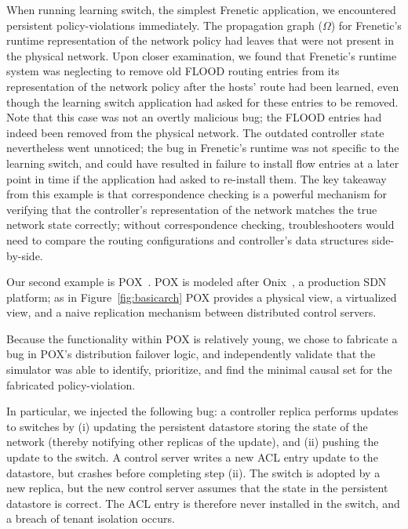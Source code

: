 When running learning switch, the simplest Frenetic application, we encountered
persistent policy-violations immediately. The propagation graph ($\Omega$) for Frenetic's
runtime representation of the network policy had leaves that were not present
in the physical network. Upon closer examination, we found that Frenetic's
runtime system was neglecting to remove old FLOOD routing entries from its
representation of the network policy after the hosts' route had been learned,
even though the learning switch application had
asked for these entries to be removed. Note that this case was not an overtly
malicious bug; the FLOOD entries had indeed been removed from the physical
network. The outdated controller state nevertheless went unnoticed; the bug in
Frenetic's runtime was not specific to the learning switch, and could have
resulted in failure to install flow entries at a later point in time if the
application had asked to re-install them. The key takeaway from this example
is that correspondence checking is a powerful mechanism for
verifying that the controller's representation of the network matches the true
network state correctly; without correspondence checking, troubleshooters
would need to compare the routing configurations and controller's data
structures side-by-side.


Our second example is POX~\cite{pox}. POX is modeled after
Onix~\cite{onix}, a production SDN platform; as in Figure~\ref{fig:basicarch} 
POX provides a physical view, a virtualized view, and a naive replication
mechanism between distributed control servers.

Because the functionality within POX is relatively young, we chose to
fabricate a bug in POX's distribution failover logic, and independently
validate that the simulator was able to identify, prioritize, and find the
minimal causal set for the fabricated policy-violation.

In particular, we injected the following bug: a controller replica performs
updates to switches by (i) updating the persistent datastore storing the state
of the network (thereby notifying other replicas of the update), and (ii) pushing the
update to the switch. A control server writes a new ACL entry update to the datastore, but crashes
before completing step (ii). The switch is adopted by a new replica,
but the new control server assumes that the state in the persistent datastore
is correct. The ACL entry is therefore never installed in the switch, and a
breach of tenant isolation occurs. 

